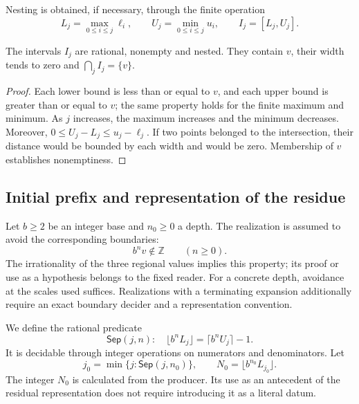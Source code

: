 Nesting is obtained, if necessary, through the finite operation
\begin{equation}
 L_j=\max_{0\leq i\leq j}\ell_i,
 \qquad U_j=\min_{0\leq i\leq j}u_i,
 \qquad I_j=[L_j,U_j].
 \label{eq:residual-anidacion}
\end{equation}

\begin{proposition}
\label{prop:residual-anidacion}
The intervals \(I_j\) are rational, nonempty and nested. They contain
\(v\), their width tends to zero and \(\bigcap_j I_j=\{v\}\).
\end{proposition}
\begin{proof}
Each lower bound is less than or equal to \(v\), and each upper bound is
greater than or equal to \(v\); the same property holds for the finite maximum and
minimum. As \(j\) increases, the maximum increases and the minimum decreases.
Moreover, \(0\leq U_j-L_j\leq u_j-\ell_j\). If two points belonged to
the intersection, their distance would be bounded by each width and would be zero.
Membership of \(v\) establishes nonemptiness.
\end{proof}

\subsection{Initial prefix and representation of the residue}
\label{subsec:residual-inicializacion}

Let \(b\geq2\) be an integer base and \(n_0\geq0\) a depth.
The realization is assumed to avoid the corresponding boundaries:
\begin{equation}
 b^n v\notin\mathbb Z\qquad(n\geq0).
 \label{eq:residual-no-frontera}
\end{equation}
The irrationality of the three regional values implies this property;
its proof or use as a hypothesis belongs to the fixed reader.
For a concrete depth, avoidance at the scales used
suffices. Realizations with a terminating expansion additionally require
an exact boundary decider and a representation convention.

We define the rational predicate
\[
 \mathsf{Sep}(j,n):\quad
 \lfloor b^n L_j\rfloor=\lceil b^n U_j\rceil-1.
\]
It is decidable through integer operations on numerators and
denominators. Let
\begin{equation}
 j_0=\min\{j:\mathsf{Sep}(j,n_0)\},
 \qquad N_0=\lfloor b^{n_0}L_{j_0}\rfloor.
 \label{eq:residual-prefijo-inicial}
\end{equation}
The integer \(N_0\) is calculated from the producer. Its use as an antecedent
of the residual representation does not require introducing it as a literal datum.

